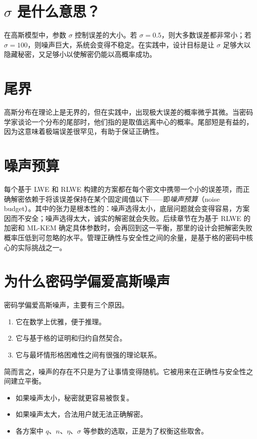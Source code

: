\section{$\sigma$ 是什么意思？}

在高斯模型中，参数 $\sigma$ 控制误差的大小。若 $\sigma=0.5$，则大多数误差都非常小；若 $\sigma=100$，则噪声巨大，系统会变得不稳定。在实践中，设计目标是让 $\sigma$ 足够大以隐藏秘密，又足够小以使解密仍能以高概率成功。

\section{尾界}

高斯分布在理论上是无界的，但在实践中，出现极大误差的概率微乎其微。当密码学家谈论一个分布的尾部时，他们指的是取值远离中心的概率。尾部短是有益的，因为这意味着极端误差很罕见，有助于保证正确性。

\section{噪声预算}

每个基于 LWE 和 RLWE 构建的方案都在每个密文中携带一个小的误差项，而正确解密依赖于将该误差保持在某个固定阈值以下——即\emph{噪声预算}（noise budget）。其中的张力是根本性的：噪声选得太小，底层问题就会变得容易，方案因而不安全；噪声选得太大，诚实的解密就会失败。后续章节在为基于 RLWE 的加密和 ML-KEM 确定具体参数时，会再回到这一平衡，那里的设计会把解密失败概率压低到可忽略的水平。管理正确性与安全性之间的余量，是基于格的密码中核心的实际挑战之一。

\section{为什么密码学偏爱高斯噪声}

密码学偏爱高斯噪声，主要有三个原因。

\begin{enumerate}
    \item 它在数学上优雅，便于推理。
    \item 它与基于格的证明和归约自然契合。
    \item 它与最坏情形格困难性之间有很强的理论联系。
\end{enumerate}

简而言之，噪声的存在不只是为了让事情变得随机。它被用来在正确性与安全性之间建立平衡。

\begin{itemize}
    \item 如果噪声太小，秘密就更容易被恢复。
    \item 如果噪声太大，合法用户就无法正确解密。
    \item 各方案中 $q$、$n$、$\eta$、$\sigma$ 等参数的选取，正是为了权衡这些取舍。
\end{itemize}

